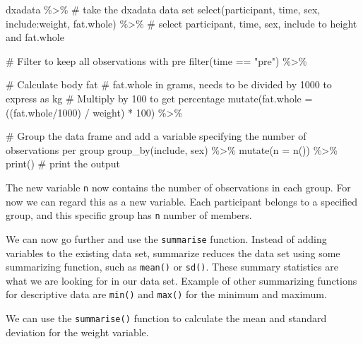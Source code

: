 \documentclass[
  11pt,
  letterpaper,
]{scrbook}
\newenvironment{Shaded}{\begin{snugshade}}{\end{snugshade}}
\newcommand{\AttributeTok}[1]{\textcolor[rgb]{0.40,0.45,0.13}{#1}}
\newcommand{\CommentTok}[1]{\textcolor[rgb]{0.37,0.37,0.37}{#1}}
\newcommand{\DecValTok}[1]{\textcolor[rgb]{0.68,0.00,0.00}{#1}}
\newcommand{\FunctionTok}[1]{\textcolor[rgb]{0.28,0.35,0.67}{#1}}
\newcommand{\NormalTok}[1]{\textcolor[rgb]{0.00,0.23,0.31}{#1}}
\newcommand{\SpecialCharTok}[1]{\textcolor[rgb]{0.37,0.37,0.37}{#1}}
\newcommand{\StringTok}[1]{\textcolor[rgb]{0.13,0.47,0.30}{#1}}
\begin{document}
\begin{Shaded}
\begin{Highlighting}[numbers=left,,]
\NormalTok{dxadata }\SpecialCharTok{\%\textgreater{}\%} \CommentTok{\# take the dxadata data set}
  \FunctionTok{select}\NormalTok{(participant, time, sex, include}\SpecialCharTok{:}\NormalTok{weight, fat.whole) }\SpecialCharTok{\%\textgreater{}\%} 
  \CommentTok{\# select participant, time, sex, include to height and fat.whole}
  
  \CommentTok{\# Filter to keep all observations with pre}
  \FunctionTok{filter}\NormalTok{(time }\SpecialCharTok{==} \StringTok{"pre"}\NormalTok{) }\SpecialCharTok{\%\textgreater{}\%}
  
  \CommentTok{\# Calculate body fat}
  \CommentTok{\# fat.whole in grams, needs to be divided by 1000 to express as kg}
  \CommentTok{\# Multiply by 100 to get percentage}
  \FunctionTok{mutate}\NormalTok{(}\AttributeTok{fat.whole =}\NormalTok{ ((fat.whole}\SpecialCharTok{/}\DecValTok{1000}\NormalTok{) }\SpecialCharTok{/}\NormalTok{ weight) }\SpecialCharTok{*} \DecValTok{100}\NormalTok{) }\SpecialCharTok{\%\textgreater{}\%}
  
  \CommentTok{\# Group the data frame and add a variable specifying the number of observations per group}
  \FunctionTok{group\_by}\NormalTok{(include, sex) }\SpecialCharTok{\%\textgreater{}\%}
  \FunctionTok{mutate}\NormalTok{(}\AttributeTok{n =} \FunctionTok{n}\NormalTok{()) }\SpecialCharTok{\%\textgreater{}\%}
  \FunctionTok{print}\NormalTok{() }\CommentTok{\# print the output}
\end{Highlighting}
\end{Shaded}

The new variable \texttt{n} now contains the number of observations in
each group. For now we can regard this as a new variable. Each
participant belongs to a specified group, and this specific group has
\texttt{n} number of members.

We can now go further and use the \texttt{summarise} function. Instead
of adding variables to the existing data set, summarize reduces the data
set using some summarizing function, such as \texttt{mean()} or
\texttt{sd()}. These summary statistics are what we are looking for in
our data set. Example of other summarizing functions for descriptive
data are \texttt{min()} and \texttt{max()} for the minimum and maximum.

We can use the \texttt{summarise()} function to calculate the mean and
standard deviation for the weight variable.
\end{document}
